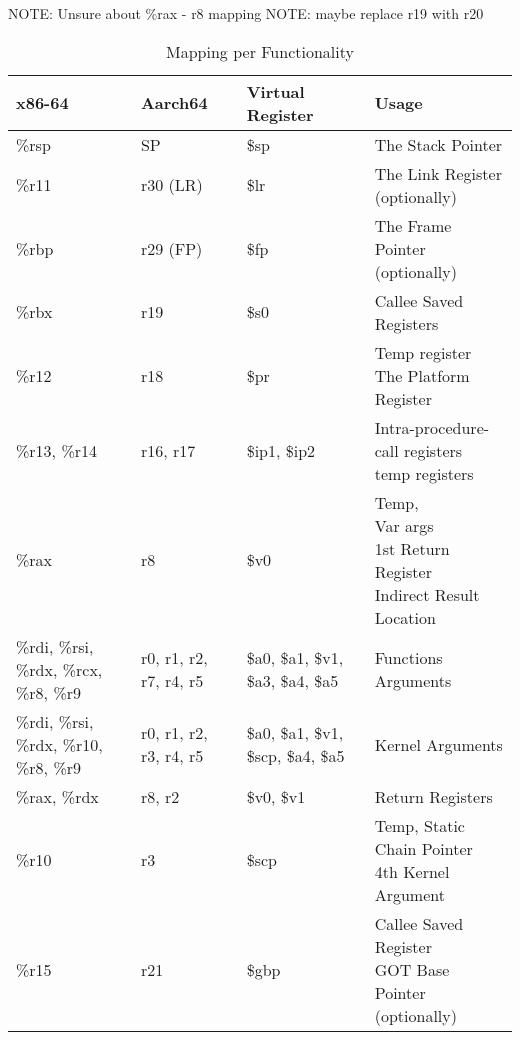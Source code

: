 \documentclass[11pt]{article}
\begin{document}
NOTE: Unsure about \%rax - r8 mapping
NOTE: maybe replace r19 with r20

\begin{table}[ht]
\caption{Mapping per Functionality}
\begin{adjustwidth}{-4.3cm}{-4.3cm}
\begin{tabular}{|l|l|l|l|}
    \hline
    \textbf{x86-64} & \textbf{Aarch64} & \textbf{Virtual Register} & \textbf{Usage} \\
    \hline
    \%rsp & SP & \$sp & The Stack Pointer \\
    \hline
    \%r11 & r30 (LR) & \$lr & The Link Register (optionally) \\
    \hline
    \%rbp & r29 (FP) & \$fp & The Frame Pointer (optionally) \\
    \hline
    \%rbx & r19 & \$s0 & Callee Saved Registers \\
    \hline
    \%r12 & r18 & \$pr & \pbox{20cm}{Temp register \\ The Platform Register} \\
    \hline
    \%r13, \%r14 & r16, r17 & \$ip1, \$ip2 & \pbox{20cm}{Intra-procedure-call registers \\ temp registers} \\
    \hline
    \%rax & r8 & \$v0 & \pbox{20cm}{Temp, \\  Var args \\ 1st Return Register \\ Indirect Result Location} \\
    \hline
    \%rdi, \%rsi, \%rdx, \%rcx, \%r8, \%r9 & r0, r1, r2, r7, r4, r5 & \$a0, \$a1, \$v1, \$a3, \$a4, \$a5 & Functions Arguments \\
    \hline
    \%rdi, \%rsi, \%rdx, \%r10, \%r8, \%r9 & r0, r1, r2, r3, r4, r5 & \$a0, \$a1, \$v1, \$scp, \$a4, \$a5 & Kernel Arguments \\
    \hline
    \%rax, \%rdx & r8, r2 & \$v0, \$v1 & Return Registers \\
    \hline
    \%r10 & r3 & \$scp & \pbox{20cm}{Temp, Static Chain Pointer \\ 4th Kernel Argument} \\
    \hline
    \%r15 & r21 & \$gbp & \pbox{20cm}{Callee Saved Register \\ GOT Base Pointer (optionally)} \\
    \hline
\end{tabular}
\end{adjustwidth}\label{tab:mappings_per_func}
\end{table}
\end{document}
